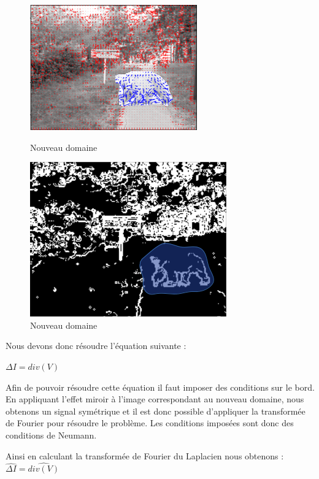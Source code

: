       \begin{figure}[!h]
        \begin{minipage}{0.5\textwidth}
     \centering
      \includegraphics[scale=0.5]{Images/V.png}
      \caption{Nouveau domaine}
      \end{minipage}\hfill
              \begin{minipage}{0.5\textwidth}
     \centering
      \includegraphics[scale=0.4]{Images/gradient.png}
      \caption{Nouveau domaine}
      \end{minipage}\hfill
      \end{figure}
Nous devons donc résoudre l'équation suivante : 
\begin{center}
$ \Delta I = div(V)$
\end{center}
Afin de pouvoir résoudre cette équation il faut imposer des conditions sur le bord. En appliquant l'effet miroir à l'image correspondant au nouveau domaine, nous obtenons un signal symétrique et il est donc possible d'appliquer la transformée de Fourier pour résoudre le problème.  Les conditions imposées sont donc des conditions de Neumann.

Ainsi en calculant la transformée de Fourier du Laplacien nous obtenons : $\widehat{\Delta I} = \widehat{div(V)}$

